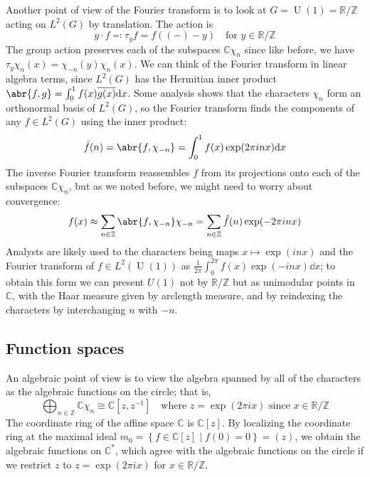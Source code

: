 \documentclass[11pt,leqno]{article}
\theoremstyle{plain}
\theoremstyle{definition}
\numberwithin{equation}{section}
\numberwithin{lem}{section}
\newcommand{\cbr}[1]{\left\{#1\right\}}
\DeclareMathOperator{\U}{U}
\begin{document}
Another point of view of the Fourier transform is to look at $G = \U(1)= \mathbb R/\mathbb Z$ acting on $L^2(G)$ by translation. The action is 
\[y\cdot f \eqqcolon \tau_yf = f((-)-y)\quad \text{for }y\in\mathbb R/\mathbb Z\]
The group action preserves each of the subspaces $\mathbb C\chi_n$ since like before, we have $\tau_y\chi_n(x) = \chi_{-n}(y)\chi_n(x)$. We can think of the Fourier transform in linear algebra terms, since $L^2(G)$ has the Hermitian inner product $\abr{f,g} = \int_0^1f(x)\overline{g(x)}\dd x$. Some analysis shows that the characters $\chi_n$ form an orthonormal basis of $L^2(G)$, so the Fourier transform finds the components of any $f\in L^2(G)$ using the inner product:
\[\hat f(n) = \abr{f,\chi_{-n}} = \int_0^1 f(x)\exp(2\pi inx)\dd x\]
The inverse Fourier transform reassembles $f$ from its projections onto each of the subspaces $\mathbb C\chi_n$, but as we noted before, we might need to worry about convergence:
\[f(x) \approx \sum_{n\in\mathbb Z}\abr{f,\chi_{-n}}\chi_{-n} = \sum_{n\in\mathbb Z}\hat f(n)\exp(-2\pi i nx)\]
Analysts are likely used to the characters being maps $x\mapsto \exp(inx)$ and the Fourier transform of $f\in L^2(\U(1))$ as $\frac{1}{2\pi}\int_0^{2\pi}f(x)\exp(-inx)\dd x$; to obtain this form we can present $U(1)$ not by $\mathbb R/\mathbb Z$ but as unimodular points in $\mathbb C$, with the Haar measure given by arclength measure, and by reindexing the characters by interchanging $n$ with $-n$.

\subsection{Function spaces}
An algebraic point of view is to view the algebra spanned by all of the characters as the algebraic functions on the circle; that is,
\[\bigoplus_{n\in\mathbb Z}\mathbb C\chi_n\cong\mathbb C[z,z^{-1}]\quad\text{where $z = \exp(2\pi ix)$ since $x\in \mathbb R/\mathbb Z$}\]
The coordinate ring of the affine space $\mathbb C$ is $\mathbb C[z]$. By localizing the coordinate ring at the maximal ideal $m_0 = \cbr{f\in \mathbb C[z]\mid f(0) = 0} = (z)$, we obtain the algebraic functions on $\mathbb C^\ast$, which agree with the algebraic functions on the circle if we restrict $z$ to $z = \exp(2\pi i x)$ for $x\in\mathbb R/\mathbb Z$.
\end{document}
